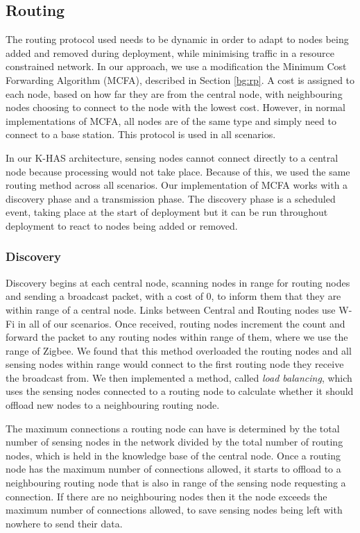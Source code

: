 \subsection{Routing}
The routing protocol used needs to be dynamic in order to adapt to nodes being added and removed during deployment, while minimising traffic in a resource constrained network. In our approach, we use a modification the Minimum Cost Forwarding Algorithm (MCFA), described in Section \ref{bg:rp}. A cost is assigned to each node, based on how far they are from the central node, with neighbouring nodes choosing to connect to the node with the lowest cost. However, in normal implementations of MCFA, all nodes are of the same type and simply need to connect to a base station. This protocol is used in all scenarios.

In our K-HAS architecture, sensing nodes cannot connect directly to a central node because processing would not take place. Because of this, we used the same routing method across all scenarios. Our implementation of MCFA works with a discovery phase and a transmission phase. The discovery phase is a scheduled event, taking place at the start of deployment but it can be run throughout deployment to react to nodes being added or removed. 

\subsubsection{Discovery}
	Discovery begins at each central node, scanning nodes in range for routing nodes and sending a broadcast packet, with a cost of 0, to inform them that they are within range of a central node. Links between Central and Routing nodes use W-Fi in all of our scenarios. Once received, routing nodes increment the count and forward the packet to any routing nodes within range of them, where we use the range of Zigbee. We found that this method overloaded the routing nodes and all sensing nodes within range would connect to the first routing node they receive the broadcast from. We then implemented a method, called \textit{load balancing}, which uses the sensing nodes connected to a routing node to calculate whether it should offload new nodes to a neighbouring routing node.
	
	The maximum connections a routing node can have is determined by the total number of sensing nodes in the network divided by the total number of routing nodes, which is held in the knowledge base of the central node. Once a routing node has the maximum number of connections allowed, it starts to offload to a neighbouring routing node that is also in range of the sensing node requesting a connection. If there are no neighbouring nodes then it the node exceeds the maximum number of connections allowed, to save sensing nodes being left with nowhere to send their data.
	
